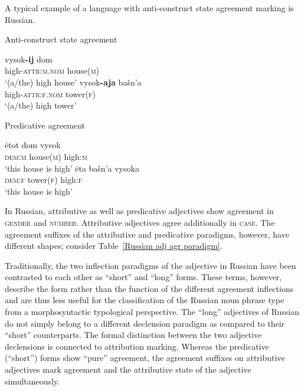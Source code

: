 A typical example of a language with anti\hyp{}construct state agreement marking is Russian.
\begin{exe}
\ex
{} \label{ru-anti}
\begin{xlist}
\ex	\rm{Anti\hyp{}construct state agreement}
\begin{xlist}
\ex
\gll 	vysok\textbf{-ij} 			dom\\
	high-\textsc{attr:m.nom} house(\textsc{m})\\
\glt	 ‘(a/the) high house’
\ex
\gll 	vysok\textbf{-aja} 			bašn'a\\
	high-\textsc{attr:f.nom} tower(\textsc{f})\\
\glt	 ‘(a/the) high tower’
\end{xlist}
\ex \rm{Predicative agreement}
\begin{xlist}
\ex 
\gll 	\.etot 	dom	vysok\\
	\textsc{dem:m} house(\textsc{m}) 	high:\textsc{m}\\
\glt	 ‘this house is high’
\ex
\gll 	\.eta 	bašn'a	vysoka\\
	\textsc{dem:f} tower(\textsc{f}) 	high:\textsc{f}\\
\glt	 ‘this house is high’
\end{xlist}
\end{xlist}
\end{exe}
In Russian, attributive as well as predicative adjectives show agreement in \textsc{gender} and \textsc{number}. Attributive adjectives agree additionally in \textsc{case}. The agreement suffixes of the attributive and predicative paradigms, however, have different shapes; consider Table~\ref{Russian adj agr paradigm}.

Traditionally, the two inflection paradigms of the adjective in Russian have been contrasted to each other as “short” and “long” forms. These terms, however, describe the form rather than the function of the different agreement inflections and are thus less useful for the classification of the Russian noun phrase type from a morphosyntactic typological perspective. The “long” adjectives of Russian do not simply belong to a different declension paradigm as compared to their “short” counterparts. The formal distinction between the two adjective declensions is connected to attribution marking. Whereas the predicative (“short”) forms show “pure” agreement, the agreement suffixes on attributive adjectives mark agreement and the attributive state of the adjective simultaneously.

